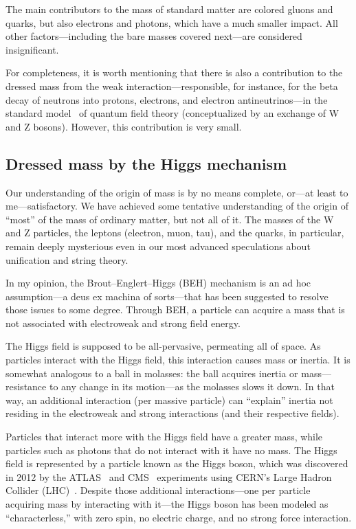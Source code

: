 The main contributors to the mass of standard matter are colored gluons and
quarks, but also electrons and photons, which have a much smaller impact.
All other factors---including the bare masses covered next---are considered insignificant.

For completeness, it is worth mentioning that there is also a contribution to the
dressed mass from the weak interaction---responsible, for instance,
for the beta decay of neutrons into protons, electrons, and electron antineutrinos---in the standard model~\cite{cottingham_greenwood_2007}
of quantum field theory (conceptualized by an exchange of W and Z bosons). However,
this contribution is very small.

\subsection{Dressed mass by the Higgs mechanism}

Our understanding of the origin of mass is by no means complete, or---at least to me---satisfactory.
We have achieved some tentative understanding
of the origin of ``most'' of the mass of ordinary matter, but not all of it. The masses
of the W and Z particles, the leptons (electron, muon, tau), and the quarks, in particular, remain deeply mysterious even in our most advanced
speculations about unification and string theory.

In my opinion, the Brout--Englert--Higgs (BEH) mechanism is an ad hoc assumption---a deus ex machina of sorts---that has been suggested to resolve those issues to some degree.
Through BEH, a particle can acquire a mass that is not associated with electroweak and strong field energy.

The Higgs field is supposed to be all-pervasive, permeating all of space.
As particles interact with the Higgs field, this interaction causes mass or inertia.
It is somewhat analogous to a ball in molasses:
the ball acquires inertia or mass---resistance to any change in its motion---as the molasses slows it down.
In that way, an additional interaction (per massive particle)
can ``explain'' inertia not residing in the electroweak and strong interactions (and
their respective fields).

Particles that interact more with the Higgs field have a greater mass,
while particles such as photons that do not interact with it have no mass.
The Higgs field is represented by a particle known as the Higgs boson,
which was discovered in 2012 by the ATLAS~\cite{ATLASLHCHIGGS2012} and CMS~\cite{CMSLHCHIGGS2012}
experiments using CERN's Large Hadron Collider (LHC)~\cite{ATLAS_Higgs-2022,CMS_Higgs-2022,ATLAS-CERN}.
Despite those additional interactions---one per particle acquiring mass by interacting with it---the Higgs boson
has been modeled as ``characterless,'' with zero spin, no electric charge, and no strong force interaction.




